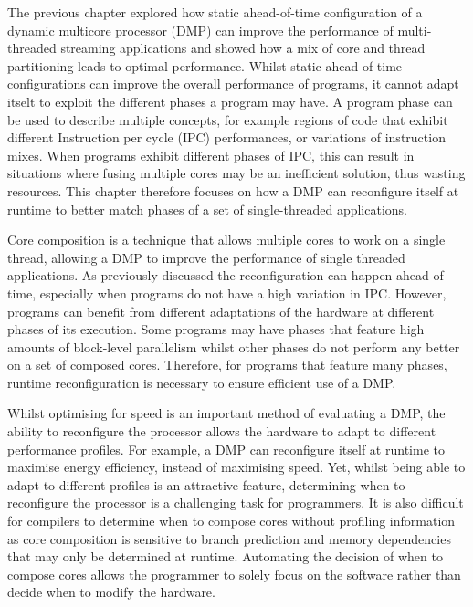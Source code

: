 The previous chapter explored how static ahead-of-time configuration of a dynamic multicore processor (DMP) can improve the performance of multi-threaded streaming applications and showed how a mix of core and thread partitioning leads to optimal performance.
Whilst static ahead-of-time configurations can improve the overall performance of programs, it cannot adapt itselt to exploit the different phases a program may have.
A program phase can be used to describe multiple concepts, for example regions of code that exhibit different Instruction per cycle (IPC) performances, or variations of instruction mixes.
When programs exhibit different phases of IPC, this can result in situations where fusing multiple cores may be an inefficient solution, thus wasting resources.
This chapter therefore focuses on how a DMP can reconfigure itself at runtime to better match phases of a set of single-threaded applications.

Core composition is a technique that allows multiple cores to work on a single thread, allowing a DMP to improve the performance of single threaded applications.
As previously discussed the reconfiguration can happen ahead of time, especially when programs do not have a high variation in IPC.
However, programs can benefit from different adaptations of the hardware at different phases of its execution.
Some programs may have phases that feature high amounts of block-level parallelism whilst other phases do not perform any better on a set of composed cores.
Therefore, for programs that feature many phases, runtime reconfiguration is necessary to ensure efficient use of a DMP.

Whilst optimising for speed is an important method of evaluating a DMP, the ability to reconfigure the processor allows the hardware to adapt to different performance profiles.
For example, a DMP can reconfigure itself at runtime to maximise energy efficiency, instead of maximising speed.
Yet, whilst being able to adapt to different profiles is an attractive feature, determining when to reconfigure the processor is a challenging task for programmers.
It is also difficult for compilers to determine when to compose cores without profiling information as core composition is sensitive to branch prediction and memory dependencies that may only be determined at runtime.%
Automating the decision of when to compose cores allows the programmer to solely focus on the software rather than decide when to modify the hardware.

